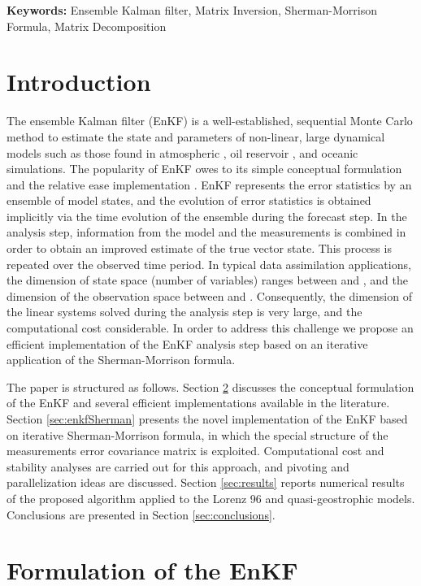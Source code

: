 \documentclass[12pt]{article}
\begin{document}
{\bf Keywords:} Ensemble Kalman filter, Matrix Inversion, Sherman-Morrison Formula, Matrix Decomposition


\section{Introduction}
\label{intro}
The ensemble Kalman filter (EnKF) is a well-established, sequential Monte Carlo method to estimate the state and parameters of non-linear, large dynamical models \cite{Even09A} such as those found in atmospheric \cite{Ott04}, oil reservoir \cite{Even09B}, and oceanic \cite{Even08} simulations. The popularity of EnKF owes to its simple conceptual formulation and the relative ease implementation \cite{Evensen2009}. EnKF represents the error statistics by an ensemble of model states, and the evolution of error statistics is obtained implicitly via the time evolution of the ensemble during the forecast step. In the analysis step, information from the model and the measurements is combined in order to obtain an improved estimate of the true vector state. This process is repeated over the observed time period. In typical data assimilation applications, the dimension of state space (number of variables) ranges between  and , and 
the dimension of the observation space between  and . Consequently, the dimension of the linear systems solved
during the analysis step is very large, and the computational cost considerable. In order to address this challenge we propose an efficient implementation of the EnKF analysis step based on an iterative application of the Sherman-Morrison formula.

The paper is structured as follows. Section \ref{sec:enkf} discusses the conceptual formulation of the EnKF and several efficient implementations available in the literature. Section \ref{sec:enkfSherman} presents the novel implementation of the EnKF based on iterative Sherman-Morrison formula, in which the special structure of the measurements error covariance matrix is exploited. Computational cost and stability analyses are carried out for this approach, and pivoting and parallelization ideas are discussed. Section \ref{sec:results} reports numerical results of the proposed algorithm applied to the Lorenz 96 and quasi-geostrophic models. Conclusions are presented in Section \ref{sec:conclusions}. 

\section{Formulation of the EnKF}\label{sec:enkf}
\end{document}
